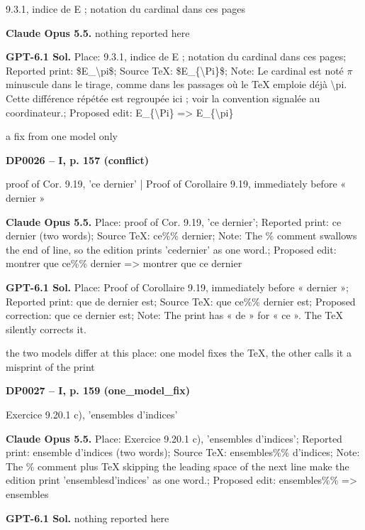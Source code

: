 9.3.1, indice de E ; notation du cardinal dans ces pages\par
\textbf{Claude Opus 5.5.} nothing reported here\par
\textbf{GPT-6.1 Sol.} Place: 9.3.1, indice de E ; notation du cardinal dans ces pages; Reported print: \$E\_\textbackslash{}pi\$; Source TeX: \$E\_\{\textbackslash{}Pi\}\$; Note: Le cardinal est noté \ensuremath{\pi} minuscule dans le tirage, comme dans les passages où le TeX emploie déjà \textbackslash{}pi. Cette différence répétée est regroupée ici ; voir la convention signalée au coordinateur.; Proposed edit: E\_\{\textbackslash{}Pi\} =\allowbreak > E\_\{\textbackslash{}pi\}\par
a fix from one model only\par
\par\noindent\hypertarget{DP0026}{}\textbf{DP0026 -- I, p. 157 (conflict)}\par
proof of Cor. 9.19, 'ce dernier' | Proof of Corollaire 9.19, immediately before « dernier »\par
\textbf{Claude Opus 5.5.} Place: proof of Cor. 9.19, 'ce dernier'; Reported print: ce dernier (two words); Source TeX: ce\%\% dernier; Note: The \% comment swallows the end of line, so the edition prints 'cedernier' as one word.; Proposed edit: montrer que ce\%\% dernier =\allowbreak > montrer que ce dernier\par
\textbf{GPT-6.1 Sol.} Place: Proof of Corollaire 9.19, immediately before « dernier »; Reported print: que de dernier est; Source TeX: que ce\%\% dernier est; Proposed correction: que ce dernier est; Note: The print has « de » for « ce ». The TeX silently corrects it.\par
the two models differ at this place: one model fixes the TeX, the other calls it a misprint of the print\par
\par\noindent\hypertarget{DP0027}{}\textbf{DP0027 -- I, p. 159 (one\_model\_fix)}\par
Exercice 9.20.1 c), 'ensembles d'indices'\par
\textbf{Claude Opus 5.5.} Place: Exercice 9.20.1 c), 'ensembles d'indices'; Reported print: ensemble d'indices (two words); Source TeX: ensembles\%\%  d'indices; Note: The \% comment plus TeX skipping the leading space of the next line make the edition print 'ensemblesd'indices' as one word.; Proposed edit: ensembles\%\% =\allowbreak > ensembles\par
\textbf{GPT-6.1 Sol.} nothing reported here\par
